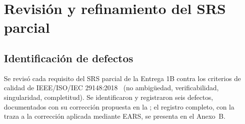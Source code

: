 \documentclass[11pt,a4paper]{report}
\begin{document}
\chapter{Revisión y refinamiento del SRS parcial}

\section{Identificación de defectos}

Se revisó cada requisito del SRS parcial de la Entrega 1B contra los criterios de calidad de
IEEE/ISO/IEC 29148:2018~\cite{ieee29148} (no ambigüedad, verificabilidad, singularidad, completitud).
Se identificaron y registraron seis defectos, documentados con su corrección propuesta en la
; el registro completo, con la traza a la corrección aplicada mediante EARS,
se presenta en el Anexo~B.
\end{document}
